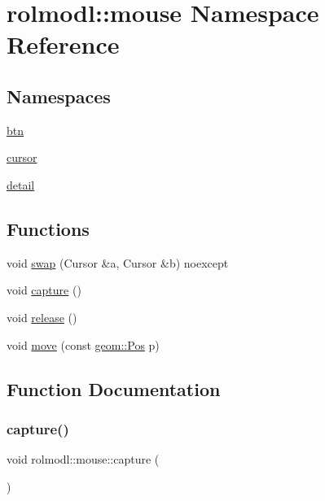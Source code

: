 \hypertarget{namespacerolmodl_1_1mouse}{}\section{rolmodl\+::mouse Namespace Reference}
\label{namespacerolmodl_1_1mouse}
\subsection*{Namespaces}
\begin{DoxyCompactItemize}
\item 
 \mbox{\hyperlink{namespacerolmodl_1_1mouse_1_1btn}{btn}}
\item 
 \mbox{\hyperlink{namespacerolmodl_1_1mouse_1_1cursor}{cursor}}
\item 
 \mbox{\hyperlink{namespacerolmodl_1_1mouse_1_1detail}{detail}}
\end{DoxyCompactItemize}
\subsection*{Functions}
\begin{DoxyCompactItemize}
\item 
void \mbox{\hyperlink{namespacerolmodl_1_1mouse_ad179b2d3502f48d5efa86ded16e3baf8}{swap}} (Cursor \&a, Cursor \&b) noexcept
\item 
void \mbox{\hyperlink{namespacerolmodl_1_1mouse_a35dfcd21a3cd7580aa5cf43e41e8e825}{capture}} ()
\item 
void \mbox{\hyperlink{namespacerolmodl_1_1mouse_aaa124795794f16d0761dc57e6aa7d9bd}{release}} ()
\item 
void \mbox{\hyperlink{namespacerolmodl_1_1mouse_a5a1885363a9ee21b07a9e57f86515af7}{move}} (const \mbox{\hyperlink{structrolmodl_1_1geom_1_1_pos}{geom\+::\+Pos}} p)
\end{DoxyCompactItemize}


\subsection{Function Documentation}
\mbox{\label{namespacerolmodl_1_1mouse_a35dfcd21a3cd7580aa5cf43e41e8e825}} 
\subsubsection{\texorpdfstring{capture()}{capture()}}
{\footnotesize\ttfamily void rolmodl\+::mouse\+::capture (\begin{DoxyParamCaption}{ }\end{DoxyParamCaption})}



